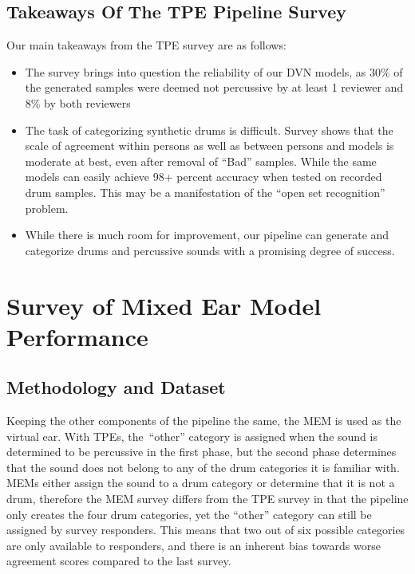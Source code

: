 \documentclass[\main/thesis.tex]{subfiles}
\begin{document}
\subsection{Takeaways Of The TPE Pipeline Survey}
Our main takeaways from the TPE survey are as follows:
\label{survey1_takeaway}
\begin{itemize}
    \item The survey brings into question the reliability of our DVN models, as 30\% of the generated samples were deemed not percussive by at least 1 reviewer and 8\% by both reviewers
    \item The task of categorizing synthetic drums is difficult. Survey shows that the scale of agreement within persons as well as between persons and models is moderate at best, even after removal of \enquote{Bad} samples.  While the same models can easily achieve 98+ percent accuracy when tested on recorded drum samples. This may be a manifestation of the \enquote{open set recognition} problem. 
    \item While there is much room for improvement, our pipeline can generate and categorize drums and percussive sounds with a promising degree of success. 
\end{itemize}

 \section{Survey of Mixed Ear Model Performance}
  \subsection{Methodology and Dataset}
 Keeping the other components of the pipeline the same, the MEM is used as the virtual ear. With TPEs, the~\enquote{other} category is assigned when the sound is determined to be percussive in the first phase, but the second phase determines that the sound does not belong to any of the drum categories it is familiar with. MEMs either assign the sound to a drum category or determine that it is not a drum, therefore the MEM survey differs from the TPE survey in that the pipeline only creates the four drum categories, yet the \enquote{other} category can still be assigned by survey responders. This means that two out of six possible categories are only available to responders, and there is an inherent bias towards worse agreement scores compared to the last survey. 
\end{document}
